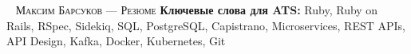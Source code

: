 
\makecvfooterwithkeywords
   {\textsc{\russiancurrentmonth \ \the\year{}}}
   {\textsc{Максим Барсуков --- Резюме}}
   {\thepage}
   {\textbf{Ключевые слова для ATS:} Ruby, Ruby on Rails, RSpec, Sidekiq, SQL, PostgreSQL, Capistrano,
                                     Microservices, REST APIs, API Design, Kafka, Docker, Kubernetes, Git}
